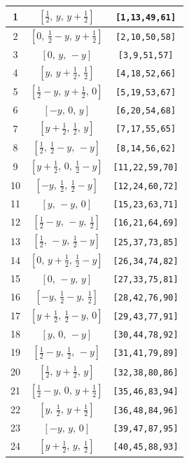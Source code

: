 \documentclass[fleqn,8pt]{jsarticle}
\begin{document}
\begin{longtable}{ccc}
1 & $\left[ \frac{1}{2},\, y,\, y + \frac{1}{2} \right]$ & {\tt [1,13,49,61]} \\ \hline
2 & $\left[ 0,\, \frac{1}{2} - y,\, y + \frac{1}{2} \right]$ & {\tt [2,10,50,58]} \\ \hline
3 & $\left[ 0,\, y,\, - y \right]$ & {\tt [3,9,51,57]} \\ \hline
4 & $\left[ y,\, y + \frac{1}{2},\, \frac{1}{2} \right]$ & {\tt [4,18,52,66]} \\ \hline
5 & $\left[ \frac{1}{2} - y,\, y + \frac{1}{2},\, 0 \right]$ & {\tt [5,19,53,67]} \\ \hline
6 & $\left[ - y,\, 0,\, y \right]$ & {\tt [6,20,54,68]} \\ \hline
7 & $\left[ y + \frac{1}{2},\, \frac{1}{2},\, y \right]$ & {\tt [7,17,55,65]} \\ \hline
8 & $\left[ \frac{1}{2},\, \frac{1}{2} - y,\, - y \right]$ & {\tt [8,14,56,62]} \\ \hline
9 & $\left[ y + \frac{1}{2},\, 0,\, \frac{1}{2} - y \right]$ & {\tt [11,22,59,70]} \\ \hline
10 & $\left[ - y,\, \frac{1}{2},\, \frac{1}{2} - y \right]$ & {\tt [12,24,60,72]} \\ \hline
11 & $\left[ y,\, - y,\, 0 \right]$ & {\tt [15,23,63,71]} \\ \hline
12 & $\left[ \frac{1}{2} - y,\, - y,\, \frac{1}{2} \right]$ & {\tt [16,21,64,69]} \\ \hline
13 & $\left[ \frac{1}{2},\, - y,\, \frac{1}{2} - y \right]$ & {\tt [25,37,73,85]} \\ \hline
14 & $\left[ 0,\, y + \frac{1}{2},\, \frac{1}{2} - y \right]$ & {\tt [26,34,74,82]} \\ \hline
15 & $\left[ 0,\, - y,\, y \right]$ & {\tt [27,33,75,81]} \\ \hline
16 & $\left[ - y,\, \frac{1}{2} - y,\, \frac{1}{2} \right]$ & {\tt [28,42,76,90]} \\ \hline
17 & $\left[ y + \frac{1}{2},\, \frac{1}{2} - y,\, 0 \right]$ & {\tt [29,43,77,91]} \\ \hline
18 & $\left[ y,\, 0,\, - y \right]$ & {\tt [30,44,78,92]} \\ \hline
19 & $\left[ \frac{1}{2} - y,\, \frac{1}{2},\, - y \right]$ & {\tt [31,41,79,89]} \\ \hline
20 & $\left[ \frac{1}{2},\, y + \frac{1}{2},\, y \right]$ & {\tt [32,38,80,86]} \\ \hline
21 & $\left[ \frac{1}{2} - y,\, 0,\, y + \frac{1}{2} \right]$ & {\tt [35,46,83,94]} \\ \hline
22 & $\left[ y,\, \frac{1}{2},\, y + \frac{1}{2} \right]$ & {\tt [36,48,84,96]} \\ \hline
23 & $\left[ - y,\, y,\, 0 \right]$ & {\tt [39,47,87,95]} \\ \hline
24 & $\left[ y + \frac{1}{2},\, y,\, \frac{1}{2} \right]$ & {\tt [40,45,88,93]} \\
\end{longtable}
\end{document}
